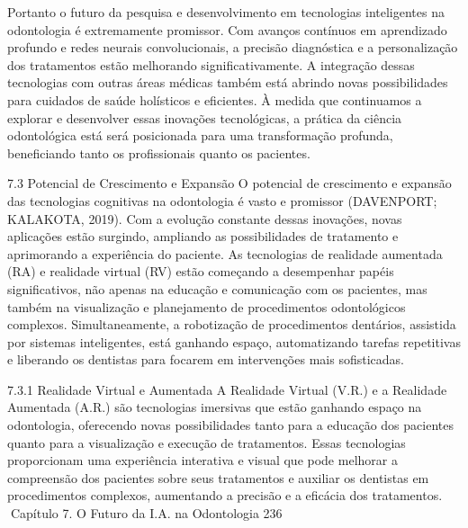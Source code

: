          Portanto o futuro da pesquisa e desenvolvimento em tecnologias inteligentes
na odontologia é extremamente promissor. Com avanços contínuos em aprendizado
profundo e redes neurais convolucionais, a precisão diagnóstica e a personalização
dos tratamentos estão melhorando significativamente. A integração dessas tecnologias
com outras áreas médicas também está abrindo novas possibilidades para cuidados de
saúde holísticos e eficientes. À medida que continuamos a explorar e desenvolver essas
inovações tecnológicas, a prática da ciência odontológica está será posicionada para
uma transformação profunda, beneficiando tanto os profissionais quanto os pacientes.


7.3     Potencial de Crescimento e Expansão
O potencial de crescimento e expansão das tecnologias cognitivas na odontologia é
vasto e promissor (DAVENPORT; KALAKOTA, 2019). Com a evolução constante dessas
inovações, novas aplicações estão surgindo, ampliando as possibilidades de tratamento
e aprimorando a experiência do paciente. As tecnologias de realidade aumentada (RA)
e realidade virtual (RV) estão começando a desempenhar papéis significativos, não
apenas na educação e comunicação com os pacientes, mas também na visualização
e planejamento de procedimentos odontológicos complexos. Simultaneamente, a
robotização de procedimentos dentários, assistida por sistemas inteligentes, está
ganhando espaço, automatizando tarefas repetitivas e liberando os dentistas para
focarem em intervenções mais sofisticadas.

7.3.1     Realidade Virtual e Aumentada
A Realidade Virtual (V.R.) e a Realidade Aumentada (A.R.) são tecnologias imersivas
que estão ganhando espaço na odontologia, oferecendo novas possibilidades tanto
para a educação dos pacientes quanto para a visualização e execução de tratamentos.
Essas tecnologias proporcionam uma experiência interativa e visual que pode melhorar
a compreensão dos pacientes sobre seus tratamentos e auxiliar os dentistas em
procedimentos complexos, aumentando a precisão e a eficácia dos tratamentos.
Capítulo 7. O Futuro da I.A. na Odontologia                                            236


